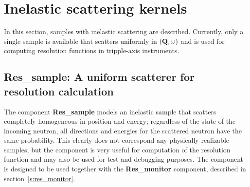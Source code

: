 
\section{Inelastic scattering kernels}
\label{s:inelastic}

In this section, samples with inelastic scattering are
described. Currently, only a single sample is available that scatters
uniformly in $({\bf Q}, \omega)$ and is used for computing resolution
functions in tripple-axis instruments.

\subsection{Res\_sample: A uniform scatterer for resolution calculation}
\label{s:res_sample}

The component \textbf{Res\_sample} models an inelastic sample that
scatters completely homogeneous in position and energy; regardless of
the state of the incoming neutron, all directions and energies for the
scattered neutron have the same probability. This clearly does not
correspond any physically realizable samples, but the component is very
useful for computation of the resolution function and may also be used
for test and debugging purposes. The component is designed to be used
together with the \textbf{Res\_monitor} component, described in
section~\ref{s:res_monitor}.

